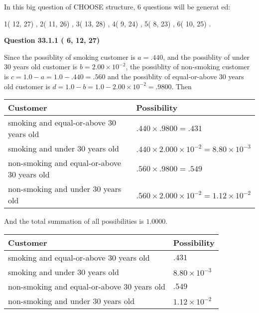 \documentclass[12pt]{article}
\begin{document}
   
\vspace{0.2in}
   
 In this big question of CHOOSE structure,           6 questions will be generat
 ed: 
  
  
            1(         12,         27)
 ,
            2(         11,         26)
 ,
            3(         13,         28)
 ,
            4(          9,         24)
 ,
            5(          8,         23)
 ,
            6(         10,         25)
 .
  
\vspace{0.2in}
  
{\textbf{\Large{Question
33.1.1 
 (          6,         12,         27)
}}}
  
  
 
 
\noindent{}

Since the possiblity of  %
smoking customer is $ a =  %
.440 $,
and the possiblity of  %
 under 30 years old customer is $ b =  %
2.00 \times 10^{-2} $,
the possiblity of  %
non-smoking customer is $ c = 1.0 - a = 1.0 -
.440
=  %
.560 $ and the possiblity of  %
equal-or-above 30 years old
customer is $ d = 1.0 - b = 1.0 -  %
2.00 \times 10^{-2} =  %
.9800  $.
Then
 
\noindent
\begin{tabular}{|l|l|}
\hline
Customer & Possibility \\
\hline
smoking  and  %
equal-or-above 30 years old  &
  $ %
.440 \times  %
.9800 =  %
.431$ \\
\hline
smoking  and  %
under 30 years old &
  $ %
.440 \times  %
2.000 \times 10^{-2} =  %
8.80 \times 10^{-3}$ \\
\hline
 non-smoking and  %
equal-or-above 30 years old  &
  $ %
.560 \times  %
.9800 =  %
.549$ \\
\hline
 non-smoking and  %
under 30 years old &
  $ %
.560 \times  %
2.000 \times 10^{-2} =  %
1.12 \times 10^{-2}$ \\
\hline
\end{tabular}
 
\noindent
And the total summation of all possibilities is $  %
1.0000 $.
 
 
 
 
 
 
\noindent{}

 
\noindent
\begin{tabular}{|l|l|}
\hline
Customer & Possibility \\
\hline
smoking  and  %
equal-or-above 30 years old &
  $ %
.431$ \\
\hline
smoking  and  %
under 30 years old &
  $ %
8.80 \times 10^{-3}$ \\
\hline
 non-smoking and  %
equal-or-above 30 years old &
  $ %
.549$ \\
\hline
 non-smoking and  %
under 30 years old &
  $ %
1.12 \times 10^{-2}$ \\
\hline
\end{tabular}
 
\end{document}
